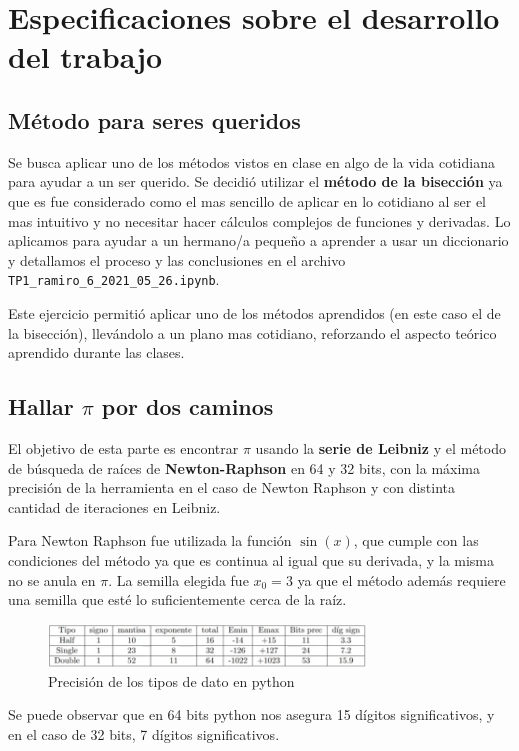\documentclass[titlepage,a4paper]{article}
\begin{document}
\section{Especificaciones sobre el desarrollo del trabajo}


\subsection{Método para seres queridos}
Se busca aplicar uno de los métodos vistos en clase en algo de la vida cotidiana para ayudar a un ser querido.
Se decidió utilizar el \textbf{método de la bisección} ya que es fue considerado como el mas sencillo de aplicar en lo cotidiano al ser el mas intuitivo y no necesitar hacer cálculos complejos de funciones y derivadas. Lo aplicamos para ayudar a un hermano/a pequeño a aprender a usar un diccionario y detallamos el proceso y las conclusiones en el archivo \verb|TP1_ramiro_6_2021_05_26.ipynb|. 

Este ejercicio permitió aplicar uno de los métodos aprendidos (en este caso el de la bisección), llevándolo a un plano mas cotidiano, reforzando el aspecto teórico aprendido durante las clases.



\subsection{Hallar \texorpdfstring{$\pi$}p por dos caminos}
El objetivo de esta parte es encontrar $\pi$ usando la \textbf{serie de Leibniz} y el método de búsqueda de raíces de \textbf{Newton-Raphson} en 64 y 32 bits, con la máxima precisión de la herramienta en el caso de Newton Raphson y con distinta cantidad de iteraciones en Leibniz.

Para Newton Raphson fue utilizada la función $\sin(x)$, que cumple con las condiciones del método ya que es continua al igual que su derivada, y la misma no se anula en $\pi$. La semilla elegida fue $x_0=3$ ya que el método además requiere una semilla que esté lo suficientemente cerca de la raíz.

\begin{figure}[H]
  \centering
    \includegraphics[width=0.75\textwidth]{tablita.png}
      \caption{Precisión de los tipos de dato en python}
\end{figure}
Se puede observar que en 64 bits python nos asegura 15 dígitos significativos, y en el caso de 32 bits, 7 dígitos significativos.
\end{document}
